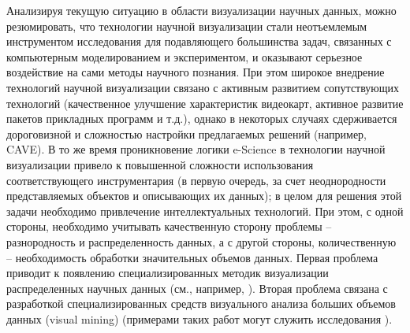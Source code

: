 Анализируя текущую ситуацию в области визуализации научных данных, можно резюмировать, что технологии научной визуализации стали неотъемлемым инструментом исследования для подавляющего большинства задач, связанных с компьютерным моделированием и экспериментом, и оказывают серьезное воздействие на сами методы научного познания. При этом широкое внедрение технологий научной визуализации связано с активным развитием сопутствующих технологий (качественное улучшение характеристик видеокарт, активное развитие пакетов прикладных программ и т.д.), однако в некоторых случаях сдерживается дороговизной и сложностью настройки предлагаемых решений (например, CAVE). В то же время проникновение логики e-Science в технологии научной визуализации привело к повышенной сложности использования соответствующего инструментария (в первую очередь, за счет неоднородности представляемых объектов и описывающих их данных); в целом для решения этой задачи необходимо привлечение интеллектуальных технологий. При этом, с одной стороны, необходимо учитывать качественную сторону проблемы – разнородность и распределенность данных, а с другой стороны, количественную – необходимость обработки значительных объемов данных. Первая проблема приводит к появлению специализированных методик визуализации распределенных научных данных (см., например, \citep{dk69}\citep{dk70}). Вторая проблема связана с разработкой специализированных средств визуального анализа больших объемов данных (visual mining) (примерами таких работ могут служить исследования \citep{dk71}\citep{dk72}). 

